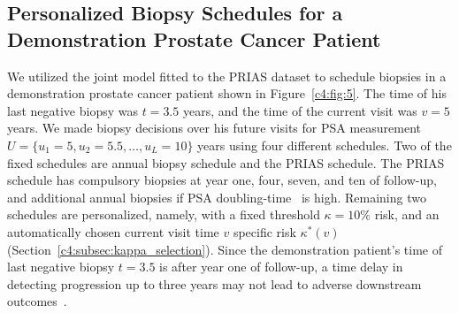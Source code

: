 \subsection{Personalized Biopsy Schedules for a Demonstration Prostate Cancer Patient}
\label{c4:subsec:demo_patient}
We utilized the joint model fitted to the PRIAS dataset to schedule biopsies in a demonstration prostate cancer patient shown in Figure~\ref{c4:fig:5}. The time of his last negative biopsy was $t=3.5$ years, and the time of the current visit was $v=5$ years. We made biopsy decisions over his future visits for PSA measurement $U=\{u_1=5, u_2=5.5,\ldots,u_L=10\}$ years using four different schedules. Two of the fixed schedules are annual biopsy schedule and the PRIAS schedule. The PRIAS schedule has compulsory biopsies at year one, four, seven, and ten of follow-up, and additional annual biopsies if PSA doubling-time~\citep{bokhorst2015compliance} is high. Remaining two schedules are personalized, namely, with a fixed threshold $\kappa=10\%$ risk, and an automatically chosen current visit time $v$ specific risk $\kappa^*(v)$ (Section~\ref{c4:subsec:kappa_selection}). Since the demonstration patient's time of last negative biopsy $t=3.5$ is after year one of follow-up, a time delay in detecting progression
up to three years may not lead to adverse downstream outcomes~\citep{carvalho}.

